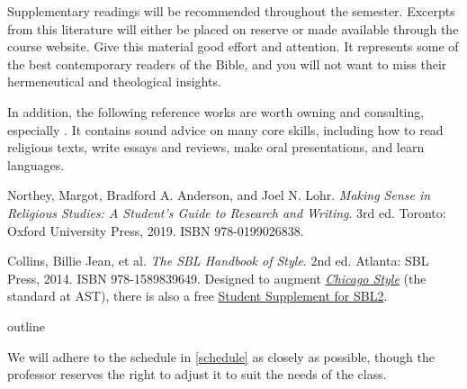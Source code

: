 \documentclass[titlepage]{article}
\begin{document}
Supplementary readings will be recommended throughout the semester.
Excerpts from this literature will either be placed on reserve or made
available through the course website. Give this material good effort and
attention. It represents some of the best contemporary readers of the
Bible, and you will not want to miss their hermeneutical and theological
insights.

In addition, the following reference works are worth owning and
consulting, especially \cite{rlgs}. It contains sound advice on many
core skills, including how to read religious texts, write essays and
reviews, make oral presentations, and learn languages.

\begingroup
\renewcommand{\section}[2]{}%
\begin{thebibliography}{Making Sense}%

	 Northey, Margot, Bradford A. Anderson, and Joel N. Lohr.
	\emph{Making Sense in Religious Studies: A Student's Guide to Research and Writing}.
	3rd ed. Toronto: Oxford University Press, 2019. ISBN 978-0199026838.

	 Collins, Billie Jean, et al.
	\emph{The SBL Handbook of Style}.
	2nd ed. Atlanta: SBL Press, 2014. ISBN 978-1589839649.
	Designed to augment \href{http://www.chicagomanualofstyle.org/home.html}{\emph{Chicago Style}}
	(the standard at AST), there is also a free
	\href{https://www.sbl-site.org/assets/pdfs/pubs/SBLHSsupp2015-02.pdf}{Student Supplement for SBL2}.

\end{thebibliography}
\endgroup



\section{Course Outline}
\label{outline}

We will adhere to the schedule in \autoref{schedule} as closely as
possible, though the professor reserves the right to adjust it to suit
the needs of the class.

\newcommand\HBFB[1]{\cite[#1]{hbfb}}
\end{document}
